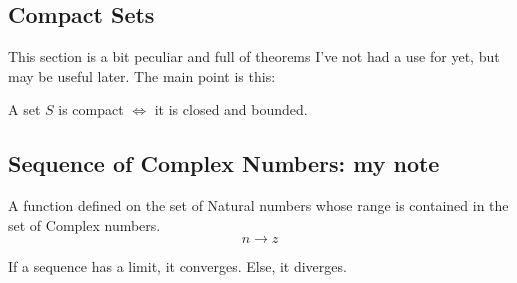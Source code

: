 \subsection{Compact Sets}
This section is a bit peculiar and full of theorems I've not had a use for yet, but may be useful later. The main point is this:
\begin{thm}
	A set $S$ is compact $\iff$ it is closed and bounded.
\end{thm}

\subsection{Sequence of Complex Numbers: my note}

\begin{defn}
	A function defined on the set of Natural numbers whose 
	range is contained in the set of Complex numbers.
	\[n \to z\]
\end{defn}

If a sequence has a limit, it converges. Else, it diverges.

